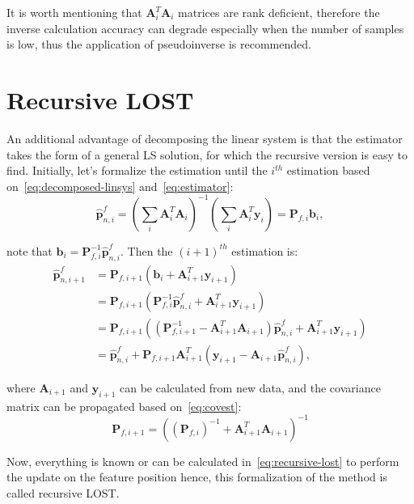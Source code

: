 It is worth mentioning that $\mathbf{A}_i^T\mathbf{A}_i$ matrices are rank deficient, therefore the inverse calculation accuracy can degrade especially when the number of samples is low, thus the application of pseudoinverse is recommended.

\section{Recursive LOST}

An additional advantage of decomposing the linear system is that the estimator takes the form of a general LS solution, for which the recursive version is easy to find. Initially, let's formalize the estimation until the $i^{th}$ estimation based on~\eqref{eq:decomposed-linsys} and~\eqref{eq:estimator}:
\begin{equation}
    \hat{\mathbf{p}}_{n, i}^f={\left(\sum_{i}\mathbf{A}_i^T\mathbf{A}_i\right)}^{-1}\left(\sum_i\mathbf{A}_i^T\mathbf{y}_i\right) = \mathbf{P}_{f, i}\mathbf{b}_i,
\end{equation}

note that $\mathbf{b}_i=\mathbf{P}_{f, i}^{-1}\hat{\mathbf{p}}_{n, i}^f$. Then the ${(i+1)}^{th}$ estimation is:
\begin{equation}
\begin{aligned}
    \hat{\mathbf{p}}_{n, i+1}^f &= \mathbf{P}_{f, i+1}\left(\mathbf{b}_i + \mathbf{A}_{i+1}^T \mathbf{y}_{i+1}\right) \\ &=
    \mathbf{P}_{f, i+1}\left(\mathbf{P}_{f, i}^{-1}\hat{\mathbf{p}}_{n, i}^f + \mathbf{A}_{i+1}^T \mathbf{y}_{i+1}\right) \\ &=
    \mathbf{P}_{f, i+1}\left(\left(\mathbf{P}_{f, i+1}^{-1} - \mathbf{A}_{i+1}^T\mathbf{A}_{i+1}\right)\hat{\mathbf{p}}_{n, i}^f + \mathbf{A}_{i+1}^T \mathbf{y}_{i+1}\right) \\ &=
     \hat{\mathbf{p}}_{n, i}^f + \mathbf{P}_{f, i+1}\mathbf{A}_{i+1}^T\left( \mathbf{y}_{i+1} -\mathbf{A}_{i+1}\hat{\mathbf{p}}_{n, i}^f\right),
\end{aligned}
\label{eq:recursive-lost}
\end{equation}

where $\mathbf{A}_{i+1}$ and $\mathbf{y}_{i+1}$ can be calculated from new data, and the covariance matrix can be propagated based on~\eqref{eq:covest}:
\begin{equation}
     \mathbf{P}_{f, i+1} = {\left({(\mathbf{P}_{f, i})}^{-1}+\mathbf{A}_{i+1}^T\mathbf{A}_{i+1}\right)}^{-1}
\end{equation}

Now, everything is known or can be calculated in~\eqref{eq:recursive-lost} to perform the update on the feature position hence, this formalization of the method is called recursive LOST.\@